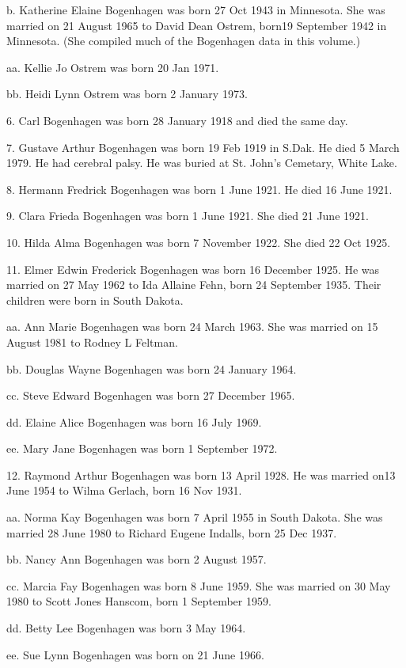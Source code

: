 \documentclass[a4paper]{article}
\begin{document}
b. Katherine Elaine Bogenhagen was born 27 Oct 1943 in Minnesota. She was married on 21 August 1965 to David Dean Ostrem, born19 September 1942 in Minnesota.  (She compiled much of the Bogenhagen data in this volume.)

aa. Kellie Jo Ostrem was born 20 Jan 1971.

bb. Heidi Lynn Ostrem was born 2 January 1973.

6. Carl Bogenhagen was born 28 January 1918 and died the same day.

7. Gustave Arthur Bogenhagen was born 19 Feb 1919 in S.Dak.  He died 5 March 1979.  He had cerebral palsy.  He was buried at St. John's Cemetary, White Lake.

8. Hermann Fredrick Bogenhagen was born 1 June 1921.  He died 16 June 1921.

9. Clara Frieda Bogenhagen was born 1 June 1921. She died 21 June 1921.

10. Hilda Alma Bogenhagen was born 7 November 1922.  She died 22 Oct 1925.

11. Elmer Edwin Frederick Bogenhagen was born 16 December 1925.  He was married on 27 May 1962 to Ida Allaine Fehn, born 24 September 1935.  Their children were born in South Dakota.

aa. Ann Marie Bogenhagen was born 24 March 1963.  She was married on 15 August 1981 to Rodney L Feltman.

bb. Douglas Wayne Bogenhagen was born 24 January 1964.

cc. Steve Edward Bogenhagen was born 27 December 1965.

dd. Elaine Alice Bogenhagen was born 16 July 1969.

ee. Mary Jane Bogenhagen was born 1 September 1972. 	

12. Raymond Arthur Bogenhagen was born 13 April 1928.  He was married on13 June 1954 to Wilma Gerlach, born 16 Nov 1931.

aa. Norma Kay Bogenhagen was born 7 April 1955 in South Dakota.  She was married 28 June 1980 to Richard Eugene Indalls, born 25 Dec 1937.
 
bb. Nancy Ann Bogenhagen was born 2 August 1957.

cc. Marcia Fay Bogenhagen was born 8 June 1959.  She was married on 30 May 1980 to Scott Jones Hanscom, born 1 September 1959.
 
dd. Betty Lee Bogenhagen was born 3 May 1964.

ee. Sue Lynn Bogenhagen was born on 21 June 1966.
\end{document}
